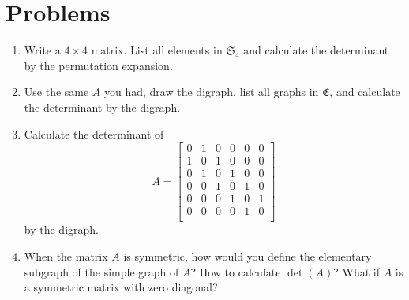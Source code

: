 \documentclass{article}
\theoremstyle{definition}
\begin{document}
\section*{Problems}
\begin{enumerate}
\setlength\itemsep{2em}
\item Write a $4\times 4$ matrix.  List all elements in $\mathfrak{S}_4$ and calculate the determinant by the permutation expansion.
\item Use the same $A$ you had, draw the digraph, list all graphs in $\mathfrak{E}$, and calculate the determinant by the digraph.
\item Calculate the determinant of  
\[A = \begin{bmatrix} 
 0 & 1 & 0 & 0 & 0 & 0 \\
 1 & 0 & 1 & 0 & 0 & 0 \\
 0 & 1 & 0 & 1 & 0 & 0 \\
 0 & 0 & 1 & 0 & 1 & 0 \\
 0 & 0 & 0 & 1 & 0 & 1 \\
 0 & 0 & 0 & 0 & 1 & 0 \\
\end{bmatrix}\] 
by the digraph.
\item When the matrix $A$ is symmetric, how would you define the elementary subgraph of the simple graph of $A$?  How to calculate $\det(A)$?  What if $A$ is a symmetric matrix with zero diagonal?
\end{enumerate}

\end{document}
